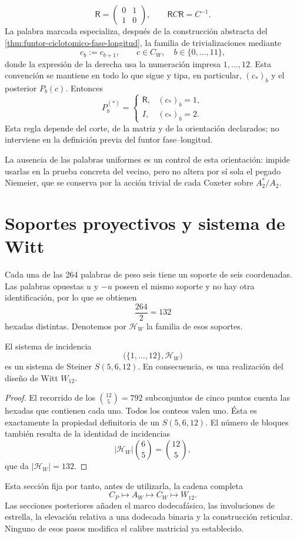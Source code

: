 \[
\mathsf R=
\begin{pmatrix}
0&1\\
1&0
\end{pmatrix},
\qquad
\mathsf R C\mathsf R=C^{-1}.
\]
La palabra marcada especializa, después de la construcción abstracta del
\cref{thm:funtor-ciclotomico-fase-longitud}, la familia de trivializaciones
mediante
\[
c_b:=c_{b+1},
\qquad c\in C_W,\quad b\in\{0,\ldots,11\},
\]
donde la expresión de la derecha usa la numeración impresa
\(1,\ldots,12\). Esta convención se mantiene en todo lo que sigue y tipa, en
particular, \((c_\ast)_b\) y el posterior \(P_b(c)\). Entonces
\[
P_b^{(\ast)}=
\begin{cases}
\mathsf R,&(c_\ast)_b=1,\\
I,&(c_\ast)_b=2.
\end{cases}
\]
Esta regla depende del corte, de la matriz y de la orientación declarados;
no interviene en la definición previa del funtor fase--longitud.

La ausencia de las palabras uniformes es un control de esta orientación:
impide usarlas en la prueba concreta del vecino, pero no altera por sí sola
el pegado Niemeier, que se conserva por la acción trivial de cada Coxeter
sobre \(A_2^\ast/A_2\).

\section{Soportes proyectivos y sistema de Witt}

Cada una de las 264 palabras de peso seis tiene un soporte de seis
coordenadas. Las palabras opuestas \(u\) y \(-u\) poseen el mismo soporte y
no hay otra identificación, por lo que se obtienen
\[
 \frac{264}{2}=132
\]
hexadas distintas. Denotemos por \(\mathcal H_W\) la familia de esos
soportes.

\begin{theorem}
El sistema de incidencia
\[
 \bigl(\{1,\ldots,12\},\mathcal H_W\bigr)
\]
es un sistema de Steiner \(S(5,6,12)\). En consecuencia, es una realización
del diseño de Witt \(W_{12}\).
\end{theorem}

\begin{proof}
El recorrido de los \(\binom{12}{5}=792\) subconjuntos de cinco puntos cuenta
las hexadas que contienen cada uno. Todos los conteos valen
uno. Ésta es exactamente la propiedad definitoria de un
\(S(5,6,12)\). El número de bloques también resulta de la identidad de
incidencias
\[
 |\mathcal H_W|\binom65=\binom{12}{5},
\]
que da \(|\mathcal H_W|=132\).
\end{proof}

Esta sección fija por tanto, antes de utilizarla, la cadena completa
\[
 C_P\longmapsto A_W\longmapsto C_W\longmapsto W_{12}.
\]
Las secciones posteriores añaden el marco dodecafásico, las involuciones de
estrella, la elevación relativa a una dodecada binaria y la construcción
reticular. Ninguno de esos pasos modifica el calibre matricial ya establecido.
